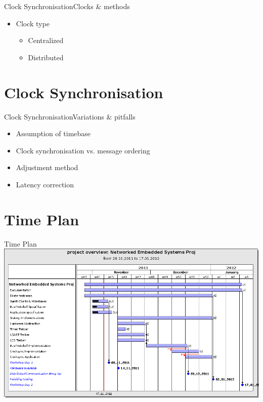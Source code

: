\documentclass{beamer}
\begin{document}
\begin{frame}{Clock Synchronisation}{Clocks \& methods}
  \begin{center}
  \begin{itemize}
    \item \begin{large}Clock type\end{large}
    \begin{itemize}
      \item Centralized
      \item Distributed
    \end{itemize}
  \end{itemize}
  \end{center}
\end{frame}


\section{Clock Synchronisation}
\begin{frame}{Clock Synchronisation}{Variations \& pitfalls}
\begin{center}
\begin{itemize}
  \item \begin{large}Assumption of timebase\end{large}
  \item \begin{large}Clock synchronisation vs. message ordering\end{large}
  \item \begin{large}Adjustment method\end{large}
  \item \begin{large}Latency correction\end{large}
\end{itemize}
\end{center}
\end{frame}

\section{Time Plan}
\begin{frame}{Time Plan}
\includegraphics[width=1.0\textwidth]{./images/201111_ganttchart.png}
\vspace{1cm}
\end{frame}
\end{document}

